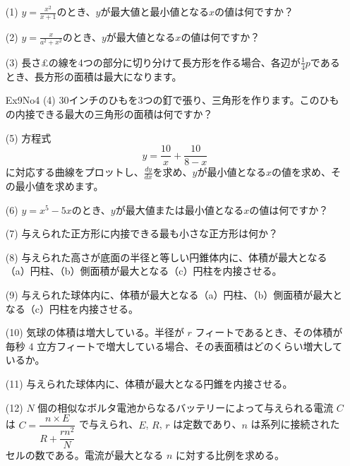 \documentclass[a4paper,11pt,openany]{ltjsbook}
\begin{document}
\begin{enumerate}
\item[(1)] $y = \frac{x^2}{x+1}$のとき、$y$が最大値と最小値となる$x$の値は何ですか？

\item[(2)] $y = \frac{x}{a^2+x^2}$のとき、$y$が最大値となる$x$の値は何ですか？

\item[(3)] 長さ£の線を4つの部分に切り分けて長方形を作る場合、各辺が$\frac{1}{4}p$であるとき、長方形の面積は最大になります。

\item[Ex9No4]{(4)} 30インチのひもを3つの釘で張り、三角形を作ります。このひもの内接できる最大の三角形の面積は何ですか？

\item[(5)] 方程式
\[
y = \frac{10}{x} + \frac{10}{8-x}
\]
に対応する曲線をプロットし、$\frac{dy}{dx}$を求め、$y$が最小値となる$x$の値を求め、その最小値を求めます。

\item[(6)] $y = x^5 - 5x$のとき、$y$が最大値または最小値となる$x$の値は何ですか？

\item[(7)] 与えられた正方形に内接できる最も小さな正方形は何か？

\item[(8)] 与えられた高さが底面の半径と等しい円錐体内に、体積が最大となる（a）円柱、（b）側面積が最大となる（c）円柱を内接させる。

\item[(9)] 与えられた球体内に、体積が最大となる（a）円柱、（b）側面積が最大となる（c）円柱を内接させる。

\item[(10)] 気球の体積は増大している。半径が \( r \) フィートであるとき、その体積が毎秒 4 立方フィートで増大している場合、その表面積はどのくらい増大しているか。

\item[(11)] 与えられた球体内に、体積が最大となる円錐を内接させる。

\item[(12)] \( N \) 個の相似なボルタ電池からなるバッテリーによって与えられる電流 \( C \) は \( C = \dfrac{n\times E}{R+\dfrac{rn^2}{N}} \) で与えられ、\( E \), \( R \), \( r \) は定数であり、\( n \) は系列に接続されたセルの数である。電流が最大となる \( n \) に対する比例を求める。
\end{enumerate}
\end{document}
